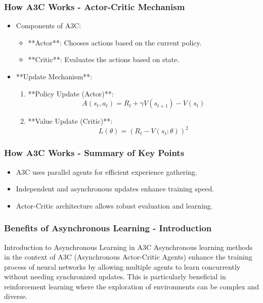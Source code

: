 \documentclass{beamer}
\begin{document}
\begin{frame}[fragile]
    \frametitle{How A3C Works - Actor-Critic Mechanism}
    \begin{itemize}
        \item Components of A3C:
            \begin{itemize}
                \item **Actor**: Chooses actions based on the current policy.
                \item **Critic**: Evaluates the actions based on state.
            \end{itemize}
        \item **Update Mechanism**:
            \begin{enumerate}
                \item **Policy Update (Actor)**:
                    \begin{equation}
                        A(s_t, a_t) = R_t + \gamma V(s_{t+1}) - V(s_t)
                    \end{equation}
                \item **Value Update (Critic)**:
                    \begin{equation}
                        L(\theta) = \left( R_t - V(s_t; \theta) \right)^2
                    \end{equation}
            \end{enumerate}
    \end{itemize}
\end{frame}

\begin{frame}[fragile]
    \frametitle{How A3C Works - Summary of Key Points}
    \begin{itemize}
        \item A3C uses parallel agents for efficient experience gathering.
        \item Independent and asynchronous updates enhance training speed.
        \item Actor-Critic architecture allows robust evaluation and learning.
    \end{itemize}
\end{frame}

\begin{frame}[fragile]
    \frametitle{Benefits of Asynchronous Learning - Introduction}
    \begin{block}{Introduction to Asynchronous Learning in A3C}
        Asynchronous learning methods in the context of A3C (Asynchronous Actor-Critic Agents) enhance the training process of neural networks by allowing multiple agents to learn concurrently without needing synchronized updates. This is particularly beneficial in reinforcement learning where the exploration of environments can be complex and diverse.
    \end{block}
\end{frame}
\end{document}
